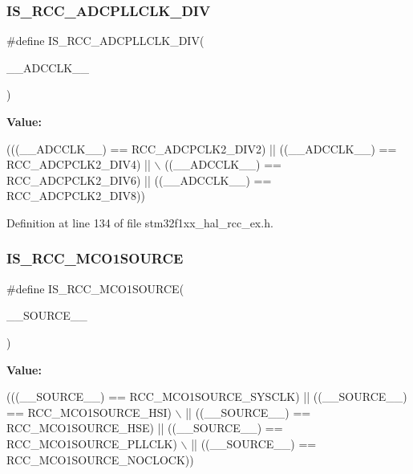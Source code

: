 \subsubsection{\texorpdfstring{I\+S\+\_\+\+R\+C\+C\+\_\+\+A\+D\+C\+P\+L\+L\+C\+L\+K\+\_\+\+D\+IV}{IS\_RCC\_ADCPLLCLK\_DIV}}
{\footnotesize\ttfamily \#define I\+S\+\_\+\+R\+C\+C\+\_\+\+A\+D\+C\+P\+L\+L\+C\+L\+K\+\_\+\+D\+IV(\begin{DoxyParamCaption}\item[{}]{\+\_\+\+\_\+\+A\+D\+C\+C\+L\+K\+\_\+\+\_\+ }\end{DoxyParamCaption})}

{\bfseries Value\+:}
\begin{DoxyCode}
(((\_\_ADCCLK\_\_) == RCC\_ADCPCLK2\_DIV2)  || ((\_\_ADCCLK\_\_) == RCC\_ADCPCLK2\_DIV4)   || \(\backslash\)
                                          ((\_\_ADCCLK\_\_) == RCC\_ADCPCLK2\_DIV6)  || ((\_\_ADCCLK\_\_) == 
      RCC\_ADCPCLK2\_DIV8))
\end{DoxyCode}


Definition at line 134 of file stm32f1xx\+\_\+hal\+\_\+rcc\+\_\+ex.\+h.

\mbox{\label{group___r_c_c_ex___private___macros_ga17690472f266a032db5324907a0ddc31}} 
\subsubsection{\texorpdfstring{I\+S\+\_\+\+R\+C\+C\+\_\+\+M\+C\+O1\+S\+O\+U\+R\+CE}{IS\_RCC\_MCO1SOURCE}}
{\footnotesize\ttfamily \#define I\+S\+\_\+\+R\+C\+C\+\_\+\+M\+C\+O1\+S\+O\+U\+R\+CE(\begin{DoxyParamCaption}\item[{}]{\+\_\+\+\_\+\+S\+O\+U\+R\+C\+E\+\_\+\+\_\+ }\end{DoxyParamCaption})}

{\bfseries Value\+:}
\begin{DoxyCode}
(((\_\_SOURCE\_\_) == RCC\_MCO1SOURCE\_SYSCLK)  || ((\_\_SOURCE\_\_) == RCC\_MCO1SOURCE\_HSI) \(\backslash\)
                                    || ((\_\_SOURCE\_\_) == RCC\_MCO1SOURCE\_HSE)     || ((\_\_SOURCE\_\_) == 
      RCC\_MCO1SOURCE\_PLLCLK) \(\backslash\)
                                    || ((\_\_SOURCE\_\_) == RCC\_MCO1SOURCE\_NOCLOCK))
\end{DoxyCode}


